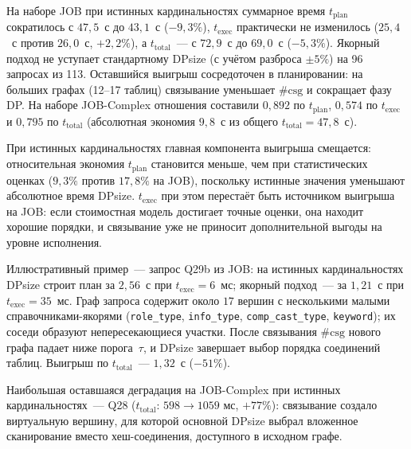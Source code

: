 На наборе JOB при истинных кардинальностях суммарное
время $t_{\mathrm{plan}}$ сократилось с $47{,}5$~с до $43{,}1$~с
($-9{,}3\%$), $t_{\mathrm{exec}}$ практически не изменилось
($25{,}4$~с против $26{,}0$~с, $+2{,}2\%$),
а $t_{\mathrm{total}}$~--- с $72{,}9$~с до $69{,}0$~с ($-5{,}3\%$).
Якорный подход не уступает стандартному DPsize (с учётом разброса $\pm 5\%$)
на 96 запросах из 113. Оставшийся выигрыш сосредоточен в планировании:
на больших графах (12--17 таблиц) связывание уменьшает $\#\mathrm{csg}$
и сокращает фазу DP.
На наборе JOB-Complex отношения составили
$0{,}892$ по $t_{\mathrm{plan}}$, $0{,}574$ по $t_{\mathrm{exec}}$
и $0{,}795$ по $t_{\mathrm{total}}$
(абсолютная экономия $9{,}8$~с из общего $t_{\mathrm{total}} = 47{,}8$~с).
\par

При истинных кардинальностях главная компонента выигрыша смещается:
относительная экономия $t_{\mathrm{plan}}$ становится меньше, чем при
статистических оценках ($9{,}3\%$ против $17{,}8\%$ на JOB), поскольку
истинные значения уменьшают абсолютное время DPsize.
$t_{\mathrm{exec}}$ при этом перестаёт быть источником выигрыша на JOB:
если стоимостная модель достигает точные оценки, она находит хорошие порядки, 
и связывание уже не приносит дополнительной
выгоды на уровне исполнения.
\par

Иллюстративный пример~--- запрос Q29b из JOB: на истинных кардинальностях
DPsize строит план за $2{,}56$~с при $t_{\mathrm{exec}} = 6$~мс;
якорный подход~--- за $1{,}21$~с при $t_{\mathrm{exec}} = 35$~мс.
Граф запроса содержит около $17$ вершин с несколькими малыми
справочниками-якорями (\texttt{role\_type}, \texttt{info\_type},
\texttt{comp\_cast\_type}, \texttt{keyword}); их соседи
образуют непересекающиеся участки. После связывания
$\#\mathrm{csg}$ нового графа падает ниже порога~$\tau$, и DPsize
завершает выбор порядка соединений таблиц. Выигрыш по $t_{\mathrm{total}}$~--- $1{,}32$~с ($-51\%$).
\par

Наибольшая оставшаяся деградация на JOB-Complex при истинных
кардинальностях~--- Q28 ($t_{\mathrm{total}}$: $598 \to 1059$ мс, $+77\%$):
связывание создало виртуальную вершину, для которой основной DPsize
выбрал вложенное сканирование вместо хеш-соединения,
доступного в исходном графе.
\par

